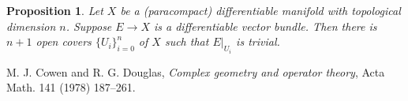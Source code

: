 \documentclass[a4paper,10pt]{amsart}
\newtheorem{proposition}{Proposition}[section]
\begin{document}
\begin{proposition}
    Let $X$ be a (paracompact) differentiable manifold with topological
    dimension $n$. Suppose $E \rightarrow X$ is a differentiable vector
    bundle. Then there is $n+1$ open covers $\{U_{i}\}_{i=0}^{n}$ of 
    $X$ such that $E|_{U_{i}}$ is trivial.
\end{proposition}
\begin{thebibliography}{9}
    M. J. Cowen and R. G. Douglas, 
    \emph{Complex geometry and operator theory}, 
    Acta Math. 141 (1978) 187–261.
\end{thebibliography}
\end{document}
